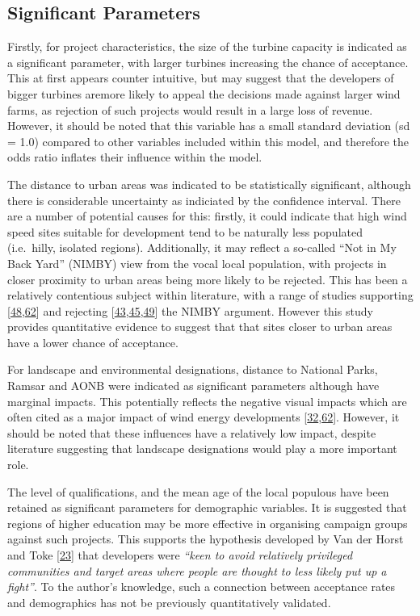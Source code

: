 \documentclass[a4paper,]{article}
\theoremstyle{definition}
\theoremstyle{definition}
\theoremstyle{definition}
\theoremstyle{remark}
\begin{document}
\subsection{Significant Parameters}\label{significant-parameters}

Firstly, for project characteristics, the size of the turbine capacity
is indicated as a significant parameter, with larger turbines increasing
the chance of acceptance. This at first appears counter intuitive, but
may suggest that the developers of bigger turbines aremore likely to
appeal the decisions made against larger wind farms, as rejection of
such projects would result in a large loss of revenue. However, it
should be noted that this variable has a small standard deviation (sd =
1.0) compared to other variables included within this model, and
therefore the odds ratio inflates their influence within the model.

The distance to urban areas was indicated to be statistically
significant, although there is considerable uncertainty as indiciated by
the confidence interval. There are a number of potential causes for
this: firstly, it could indicate that high wind speed sites suitable for
development tend to be naturally less populated (i.e.~hilly, isolated
regions). Additionally, it may reflect a so-called ``Not in My Back
Yard'' (NIMBY) view from the vocal local population, with projects in
closer proximity to urban areas being more likely to be rejected. This
has been a relatively contentious subject within literature, with a
range of studies supporting
{[}\protect\hyperlink{ref-Haggett2006}{48},\protect\hyperlink{ref-Jones2010a}{62}{]}
and rejecting
{[}\protect\hyperlink{ref-Populus2005}{43},\protect\hyperlink{ref-Devine-Wright2005a}{45},\protect\hyperlink{ref-VanRensburg20}{49}{]}
the NIMBY argument. However this study provides quantitative evidence to
suggest that that sites closer to urban areas have a lower chance of
acceptance.

For landscape and environmental designations, distance to National
Parks, Ramsar and AONB were indicated as significant parameters although
have marginal impacts. This potentially reflects the negative visual
impacts which are often cited as a major impact of wind energy
developments
{[}\protect\hyperlink{ref-Langer2016}{32},\protect\hyperlink{ref-Jones2010a}{62}{]}.
However, it should be noted that these influences have a relatively low
impact, despite literature suggesting that landscape designations would
play a more important role.

The level of qualifications, and the mean age of the local populous have
been retained as significant parameters for demographic variables. It is
suggested that regions of higher education may be more effective in
organising campaign groups against such projects. This supports the
hypothesis developed by Van der Horst and Toke
{[}\protect\hyperlink{ref-VanderHorst2010}{23}{]} that developers were
\emph{``keen to avoid relatively privileged communities and target areas
where people are thought to less likely put up a fight''}. To the
author's knowledge, such a connection between acceptance rates and
demographics has not be previously quantitatively validated.
\end{document}
